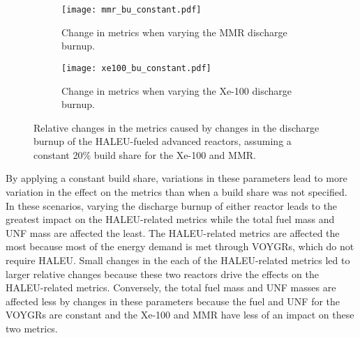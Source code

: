 \begin{figure}[h!]
    \centering
    \begin{subfigure}{0.48\textwidth}
        \centering
        \texttt{[image: mmr\_bu\_constant.pdf]}
        \caption{Change in metrics when varying the MMR discharge burnup.}
        \label{fig:mmr_bu_constant}
    \end{subfigure}
    \hfill
    \begin{subfigure}{0.48\textwidth}
        \centering
        \texttt{[image: xe100\_bu\_constant.pdf]}
        \caption{Change in metrics when varying the Xe-100 discharge burnup.}
        \label{fig:xe100_bu_constant}
    \end{subfigure}
    \caption{Relative changes in the metrics caused by changes in the discharge 
    burnup of the HALEU-fueled advanced reactors, assuming a constant 
    20\% build share for the Xe-100 and MMR.}
    \label{fig:bu_constant}
\end{figure}

By applying a constant build share, variations in these parameters lead to 
more variation in the effect on the metrics than when a build share was not 
specified. In these scenarios, varying the discharge burnup of either reactor 
leads to the greatest impact on the \gls{HALEU}-related metrics while the  
total fuel mass and \gls{UNF} mass are affected the least. 
The \gls{HALEU}-related metrics are affected the most because most of the 
energy demand is met through VOYGRs, which do not require \gls{HALEU}. 
Small changes in the each of the \gls{HALEU}-related metrics led to larger 
relative changes because these two reactors drive the effects on the 
\gls{HALEU}-related metrics. Conversely, the total fuel mass and \gls{UNF} 
masses are affected less by changes in these parameters because the fuel 
and \gls{UNF} for the VOYGRs are constant and the Xe-100 and \gls{MMR} 
have less of an impact on these two metrics. 